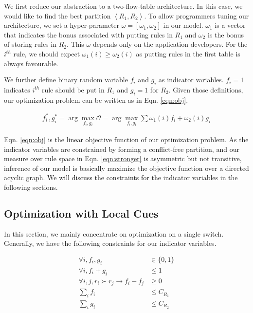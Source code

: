 \documentclass[10pt,twocolumn,letterpaper]{article}
\begin{document}
We first reduce our abstraction to a two-flow-table architecture. In this case, we would like to find the best partition $\left<R_1,R_2\right>$. To allow programmers tuning our architecture, we set a hyper-parameter $\omega=[\omega_1,\omega_2]$ in our model. $\omega_1$ is a vector that indicates the bonus associated with putting rules in $R_1$ and $\omega_2$ is the bonus of storing rules in $R_2$. This $\omega$ depends only on the application developers. For the $i^{th}$ rule, we should expect $\omega_1(i)\geq \omega_2(i)$ as putting rules in the first table is always favourable.

We further define binary random variable $f_i$ and $g_i$ as indicator variables. $f_i=1$ indicates $i^{th}$ rule should be put in $R_1$ and $g_i=1$ for $R_2$. Given those definitions, our optimization problem can be written as in Eqn. \ref{eqn:obj}.

\begin{align}
f_i^*,g_i^*=\arg\max_{f_i,g_i}\mathcal{O}= \arg\max_{f_i,g_i}\sum \omega_1(i)f_i + \omega_2(i)g_i \label{eqn:obj}
\end{align}

Eqn. \ref{eqn:obj} is the linear objective function of our optimization problem. As the indicator variables are constrained by forming a conflict-free partition, and our measure over rule space in Eqn. \ref{eqn:stronger} is asymmetric but not transitive, inference of our model is basically maximize the objective function over a directed acyclic graph. We will discuss the constraints for the indicator variables in the following sections.

\subsection{Optimization with Local Cues}
In this section, we mainly concentrate on optimization on a single switch. Generally, we have the following constraints for our indicator variables.

\begin{align}
\label{eqn:con1}\forall i, f_i, g_i &\in \{0,1\} \\
\label{eqn:con2}\forall i, f_i+g_i &\leq 1 \\
\label{eqn:con3}\forall i,j, r_i \succ r_j \to f_i-f_j &\geq 0 \\
\label{eqn:con4}\sum_i f_i &\leq C_{R_1} \\
\label{eqn:con5}\sum_i g_i &\leq C_{R_2}
\end{align}
\end{document}
